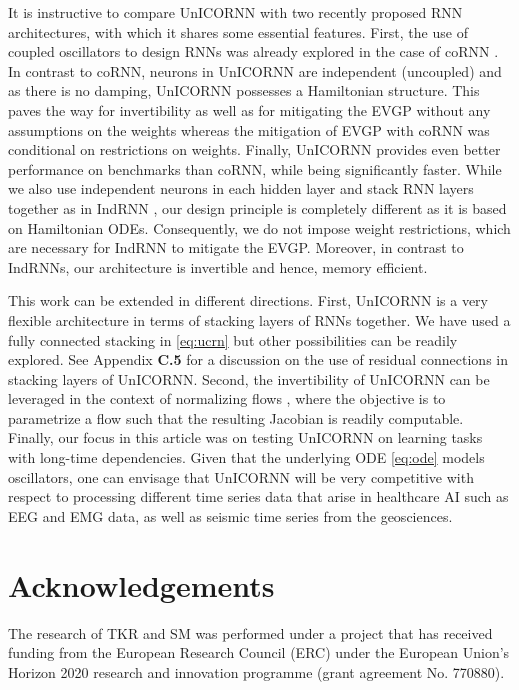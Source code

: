 \documentclass{article}
\begin{document}
It is instructive to compare UnICORNN with two recently proposed RNN architectures, with which it shares some essential features. First, the use of coupled oscillators to design RNNs was already explored in the case of coRNN \cite{coRNN}. In contrast to coRNN, neurons in UnICORNN are independent (uncoupled) and as there is no damping, UnICORNN possesses a Hamiltonian structure. This paves the way for invertibility as well as for mitigating the EVGP without any assumptions on the weights whereas the mitigation of EVGP with coRNN was conditional on restrictions on weights. Finally, UnICORNN provides even better performance on benchmarks than coRNN, while being significantly faster. While we also use independent neurons in each hidden layer and stack RNN layers together as in IndRNN \cite{indrnn}, our design principle is completely different as it is based on Hamiltonian ODEs. Consequently, we do not impose weight restrictions, which are necessary for IndRNN to mitigate the EVGP. Moreover, in contrast to IndRNNs, our architecture is invertible and hence, memory efficient. 

This work can be extended in different directions. First, UnICORNN is a very flexible architecture in terms of stacking layers of RNNs together. We have used a fully connected stacking in \eqref{eq:ucrn} but other possibilities can be readily explored. See Appendix {\bf C.5} for a discussion on the use of residual connections in stacking layers of UnICORNN. Second, the invertibility of UnICORNN can be leveraged in the context of normalizing flows \cite{nf}, where the objective is to parametrize a flow such that the resulting Jacobian is readily computable. Finally, our focus in this article was on testing UnICORNN on learning tasks with long-time dependencies. Given that the underlying ODE \eqref{eq:ode} models oscillators, one can envisage that UnICORNN will be very competitive with respect to processing different time series data that arise in healthcare AI such as EEG and EMG data, as well as seismic time series from the geosciences. 


\section*{Acknowledgements}
The research of TKR and SM was performed under  a project that has received funding from the European Research Council (ERC) under the European Union’s Horizon 2020 research and innovation programme (grant agreement No. 770880).



\end{document}
